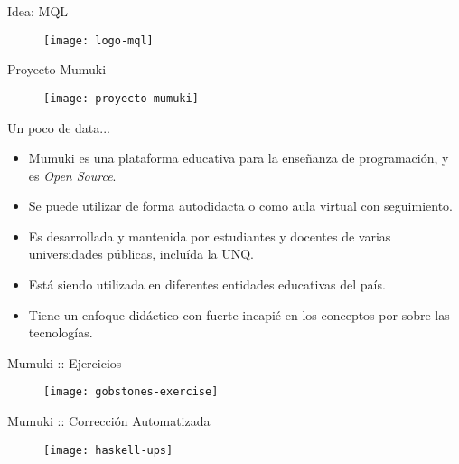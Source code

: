 \documentclass{beamer}
\begin{document}
\begin{frame}[plain]
    \titlepage
\end{frame}


\begin{frame}{Idea: MQL}
    \begin{figure}[h]
        \texttt{[image: logo-mql]}
    \end{figure}
\end{frame}


\begin{frame}{Proyecto Mumuki}
    \begin{figure}[h]
        \texttt{[image: proyecto-mumuki]}
    \end{figure}
\end{frame}


\begin{frame}{Un poco de data...}
    \begin{itemize}%
        \item Mumuki es una plataforma educativa para la enseñanza de programación, y es \textit{Open Source}.
        \item Se puede utilizar de forma autodidacta o como aula virtual con seguimiento.
        \item Es desarrollada y mantenida por estudiantes y docentes de varias universidades públicas, incluída la UNQ.
        \item Está siendo utilizada en diferentes entidades educativas del país.
        \item Tiene un enfoque didáctico con fuerte incapié en los conceptos por sobre las tecnologías.
    \end{itemize}
\end{frame}


\begin{frame}{Mumuki :: Ejercicios}
    \begin{figure}[h]
        \texttt{[image: gobstones-exercise]}
    \end{figure}
\end{frame}

\begin{frame}{Mumuki :: Corrección Automatizada}
    \begin{figure}[h]
        \texttt{[image: haskell-ups]}
    \end{figure}
\end{frame}
\end{document}
